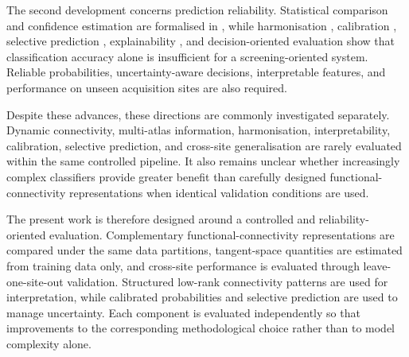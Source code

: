 The second development concerns prediction reliability. Statistical comparison and confidence estimation are formalised in \cite{ClopperPearson1934,Demsar2006}, while harmonisation \cite{Johnsonetal2007,Fortinetal2018}, calibration \cite{Guoetal2017}, selective prediction \cite{GeifmanElYaniv2017}, explainability \cite{LundbergLee2017}, and decision-oriented evaluation \cite{VanCalsteretal2018} show that classification accuracy alone is insufficient for a screening-oriented system. Reliable probabilities, uncertainty-aware decisions, interpretable features, and performance on unseen acquisition sites are also required.

Despite these advances, these directions are commonly investigated separately. Dynamic connectivity, multi-atlas information, harmonisation, interpretability, calibration, selective prediction, and cross-site generalisation are rarely evaluated within the same controlled pipeline. It also remains unclear whether increasingly complex classifiers provide greater benefit than carefully designed functional-connectivity representations when identical validation conditions are used.

The present work is therefore designed around a controlled and reliability-oriented evaluation. Complementary functional-connectivity representations are compared under the same data partitions, tangent-space quantities are estimated from training data only, and cross-site performance is evaluated through leave-one-site-out validation. Structured low-rank connectivity patterns are used for interpretation, while calibrated probabilities and selective prediction are used to manage uncertainty. Each component is evaluated independently so that improvements  to the corresponding methodological choice rather than to model complexity alone.
